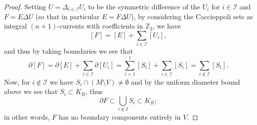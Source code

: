 \documentclass[12pt]{article}
\begin{document}
\begin{proof}
    \bigskip

    Setting $U = \Delta_{i \in \mathcal{I}} U_i$ to be the symmetric difference of the $U_i$ for $i \in \mathcal{I}$ and $F = E \Delta U$ (so that in particular $E = F \Delta U$), by considering the Caccioppoli sets as integral $(n+1)$-currents with coefficients in $\mathbb{Z}_2$, we have
    $$
    [F] = [E] + \sum_{i \in \mathcal{I}} [U_i],
    $$
    and thus by taking boundaries we see that
    $$
    \partial [F] = \partial [E] + \sum_{i \in \mathcal{I}} \partial [U_i] = \sum_{i = 1}^l [S_i] + \sum_{i \in \mathcal{I}} [S_i] = \sum_{i \notin \mathcal{I}} [S_i].
    $$
    Now, for $i \notin \mathcal{I}$ we have $S_i \cap (M \setminus V) \neq \emptyset$ and by the uniform diameter bound above we see that $S_i \subset K_R$, thus
    $$
    \partial F \subset \bigcup_{i \notin I} S_i \subset K_R;
    $$
    in other words, $F$ has no boundary components entirely in $V$. 

    \bigskip


\end{proof}
\end{document}
